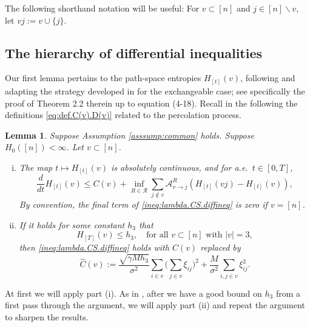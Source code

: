 \documentclass[11pt,reqno]{amsart}
\numberwithin{equation}{section}
\newtheorem{lemma}[theorem]{Lemma}
\theoremstyle{definition}
\def\CC{{C}}
\def\A{{\mathcal A}}
\begin{document}
The following shorthand notation will be useful: For $v \subset [n]$ and $j\in [n]\backslash v$, let $vj:=v\cup\{j\}$.


\subsection{The hierarchy of differential inequalities} \label{subsec:iterated.hierachy}

Our first lemma pertains to the path-space entropies $H_{[t]}(v)$, following and adapting the strategy developed in \cite{lacker2022hierarchies} for the exchangeable case; see specifically the proof of Theorem 2.2 therein up to equation (4-18).
Recall in the following the definitions \eqref{eq:def.C(v).D(v)} related to the percolation process.


\begin{lemma}\label{lem: init.ent.est}
Suppose Assumption \ref{asssump:common} holds.  Suppose $H_0([n]) < \infty$.
Let $v \subset [n]$. 
	\begin{enumerate}[(i)]
	\item The map $t \mapsto H_{[t]}(v)$  is absolutely continuous, and  for a.e.\ $t \in [0,T]$,
	\begin{equation} \label{ineq:lambda.CS.diffineq}
		\frac{d}{dt} H_{[t]}(v)  \leq \CC(v) +  \inf_{R \in \mathcal{R}} \sum_{j \notin v} \A^{R}_{v\to j} \left(H_{[t]}(vj)  - H_{[t]}(v)\right), 
	\end{equation}
	By convention, the final term of \eqref{ineq:lambda.CS.diffineq} is zero if $v=[n]$. 
	\item If it holds for some constant $h_3$ that 
	\begin{equation}
		 H_{[T]}(v) \le h_3, \quad \text{for all } v\subset [n] \text{ with } |v|=3, \label{asmp:k=3}
		\end{equation}
		 then \eqref{ineq:lambda.CS.diffineq} holds with $\CC(v)$ replaced by 
		\begin{equation}
		 \widehat{\CC}(v) := \frac{ \sqrt{\gamma M h_3}}{\sigma^2} \sum_{i \in v}\bigg(\sum_{j \in v}\xi_{ij}\bigg)^2 + \frac{M}{\sigma^2} \sum_{i,j \in v} \xi_{ij}^2. \label{def:CChat}
	\end{equation} 
	\end{enumerate}
	\end{lemma}


At first we will apply part (i). As in \cite{lacker2022hierarchies}, after we have a good bound on $h_3$ from a first pass through the argument, we will apply part (ii) and repeat the argument to sharpen the results. 
\end{document}
